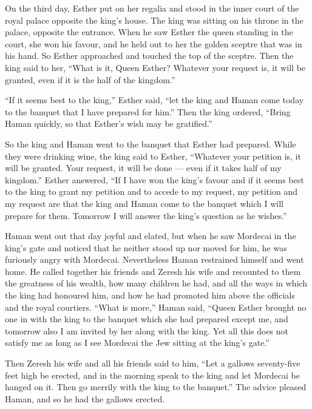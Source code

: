  On the third day, Esther put on her regalia and stood in
the inner court of the royal palace opposite the king's house. The king
was sitting on his throne in the palace, opposite the entrance.
 When he saw Esther the queen standing in the court, she won
his favour, and he held out to her the golden sceptre that was in his
hand. So Esther approached and touched the top of the sceptre.
 Then the king said to her, ``What is it, Queen Esther?
Whatever your request is, it will be granted, even if it is the half of
the kingdom.''

 ``If it seems best to the king,'' Esther said, ``let the
king and Haman come today to the banquet that I have prepared for him.''
 Then the king ordered, ``Bring Haman quickly, so that
Esther's wish may be gratified.''

So the king and Haman went to the banquet that Esther had prepared.
 While they were drinking wine, the king said to Esther,
``Whatever your petition is, it will be granted. Your request, it will
be done --- even if it takes half of my kingdom.''  Esther
answered,  ``If I have won the king's favour and if it seems
best to the king to grant my petition and to accede to my request, my
petition and my request are that the king and Haman come to the banquet
which I will prepare for them. Tomorrow I will answer the king's
question as he wishes.''

 Haman went out that day joyful and elated, but when he saw
Mordecai in the king's gate and noticed that he neither stood up nor
moved for him, he was furiously angry with Mordecai. 
Nevertheless Haman restrained himself and went home. He called together
his friends and Zeresh his wife  and recounted to them the
greatness of his wealth, how many children he had, and all the ways in
which the king had honoured him, and how he had promoted him above the
officials and the royal courtiers.  ``What is more,'' Haman
said, ``Queen Esther brought no one in with the king to the banquet
which she had prepared except me, and tomorrow also I am invited by her
along with the king.  Yet all this does not satisfy me as
long as I see Mordecai the Jew sitting at the king's gate.''

 Then Zeresh his wife and all his friends said to him,
``Let a gallows seventy-five feet high be erected, and in the morning
speak to the king and let Mordecai be hanged on it. Then go merrily with
the king to the banquet.'' The advice pleased Haman, and so he had the
gallows erected.

